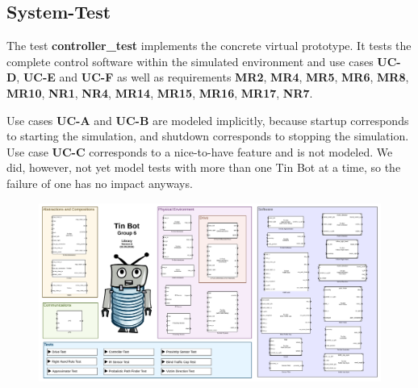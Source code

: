 \documentclass[a4paper,parskip,headheight=38pt]{scrartcl} %
\begin{document}
\subsection{System-Test}
The test \textbf{controller\_test} implements the concrete virtual prototype. It tests the complete control software within the simulated environment and use cases \textbf{UC-D}, \textbf{UC-E} and \textbf{UC-F} as well as requirements \textbf{MR2}, \textbf{MR4}, \textbf{MR5}, \textbf{MR6}, \textbf{MR8}, \textbf{MR10}, \textbf{NR1}, \textbf{NR4}, \textbf{MR14}, \textbf{MR15}, \textbf{MR16}, \textbf{MR17}, \textbf{NR7}. 


Use cases \textbf{UC-A} and \textbf{UC-B} are modeled implicitly, because startup corresponds to starting the simulation, and shutdown corresponds to stopping the simulation.
Use case \textbf{UC-C} corresponds to a nice-to-have feature and is not modeled. We did, however, not yet model tests with more than one Tin Bot at a time, so the failure of one has no impact anyways.

\pagestyle{empty}

\begin{landscape}
\begin{figure}[h]
\centering
\includegraphics[width=26cm]{library.pdf}
\label{}
\end{figure}
\end{landscape}
\end{document}
